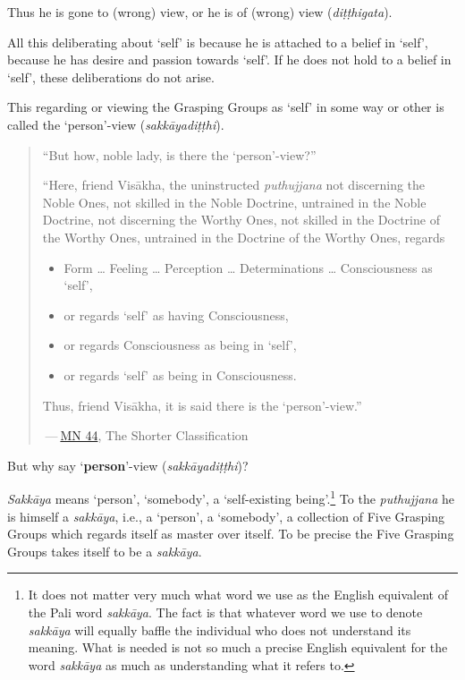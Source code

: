 Thus he is gone to (wrong) view, or he is of (wrong) view (\emph{diṭṭhigata}).

All this deliberating about `self' is because he is attached to a belief in `self', because he has desire and passion towards `self'. If he does not hold to a belief in `self', these deliberations do not arise.

This regarding or viewing the Grasping Groups as `self' in some way or other is called the `person'-view (\emph{sakkāyadiṭṭhi}).

\begin{quote}
``But how, noble lady, is there the `person'-view?''

``Here, friend Visākha, the uninstructed \emph{puthujjana} not discerning the Noble Ones, not skilled in the Noble Doctrine, untrained in the Noble Doctrine, not discerning the Worthy Ones, not skilled in the Doctrine of the Worthy Ones, untrained in the Doctrine of the Worthy Ones, regards

\begin{itemize}
\item
  Form \ldots{} Feeling \ldots{} Perception \ldots{} Determinations \ldots{} Consciousness as `self',
\item
  or regards `self' as having Consciousness,
\item
  or regards Consciousness as being in `self',
\item
  or regards `self' as being in Consciousness.
\end{itemize}

Thus, friend Visākha, it is said there is the `person'-view.''

 --- \href{https://suttacentral.net/mn44/en/sujato}{MN 44}, The Shorter Classification
\end{quote}

But why say `\textbf{person}'-view (\emph{sakkāyadiṭṭhi})?

\emph{Sakkāya} means `person', `somebody', a `self-existing being'.\footnote{It does not matter very much what word we use as the English equivalent of the Pali word \emph{sakkāya}. The fact is that whatever word we use to denote \emph{sakkāya} will equally baffle the individual who does not understand its meaning. What is needed is not so much a precise English equivalent for the word \emph{sakkāya} as much as understanding what it refers to.} To the \emph{puthujjana} he is himself a \emph{sakkāya}, i.e., a `person', a `somebody', a collection of Five Grasping Groups which regards itself as master over itself. To be precise the Five Grasping Groups takes itself to be a \emph{sakkāya}.

